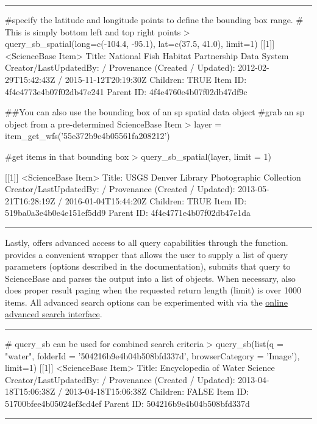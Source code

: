 \noindent\rule{\textwidth}{0.4pt}
\begin{example}
#specify the latitude and longitude points to define the bounding box range. 
# This is simply bottom left and top right points
> query_sb_spatial(long=c(-104.4, -95.1), lat=c(37.5, 41.0), limit=1)
[[1]]
<ScienceBase Item>
  Title: National Fish Habitat Partnership Data System
  Creator/LastUpdatedBy:      /
  Provenance (Created / Updated):  2012-02-29T15:42:43Z / 2015-11-12T20:19:30Z
  Children: TRUE
  Item ID: 4f4e4773e4b07f02db47e241
  Parent ID: 4f4e4760e4b07f02db47df9c

##You can also use the bounding box of an sp spatial data object
#grab an sp object from a pre-determined ScienceBase Item
> layer = item_get_wfs('55e372b9e4b05561fa208212')

#get items in that bounding box
> query_sb_spatial(layer, limit = 1)

[[1]]
<ScienceBase Item>
  Title: USGS Denver Library Photographic Collection
  Creator/LastUpdatedBy:      /
  Provenance (Created / Updated):  2013-05-21T16:28:19Z / 2016-01-04T15:44:20Z
  Children: TRUE
  Item ID: 519ba0a3e4b0e4e151ef5dd9
  Parent ID: 4f4e4771e4b07f02db47e1da
\end{example}
\noindent\rule{\textwidth}{0.4pt}

Lastly,  offers advanced access to all query capabilities through
the  function.  provides a convenient wrapper that 
allows the user to supply a list of query parameters (options described in the documentation),
submits that query to ScienceBase and parses the output
into a list of  objects. When necessary,  
also does proper result paging when the requested
return length (limit) is over 1000 items. All advanced search options can be experimented
with via the \href{https://www.sciencebase.gov/catalog/items/queryForm}
{online advanced search interface}.

\noindent\rule{\textwidth}{0.4pt}
\begin{example}

# query_sb can be used for combined search criteria
> query_sb(list(q = "water", folderId = '504216b9e4b04b508bfd337d', 
                browserCategory = 'Image'), limit=1)
[[1]]
<ScienceBase Item>
  Title: Encyclopedia of Water Science
  Creator/LastUpdatedBy:      /
  Provenance (Created / Updated):  2013-04-18T15:06:38Z / 2013-04-18T15:06:38Z
  Children: FALSE
  Item ID: 51700bfee4b05024ef3cd4ef
  Parent ID: 504216b9e4b04b508bfd337d

\end{example}
\noindent\rule{\textwidth}{0.4pt}

